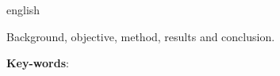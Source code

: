 \begin{resumo}[Abstract]
 \begin{otherlanguage*}{english}

Background, objective, method, results and conclusion.
   \vspace{\onelineskip}

   \noindent
   \textbf{Key-words}:
 \end{otherlanguage*}
\end{resumo}
